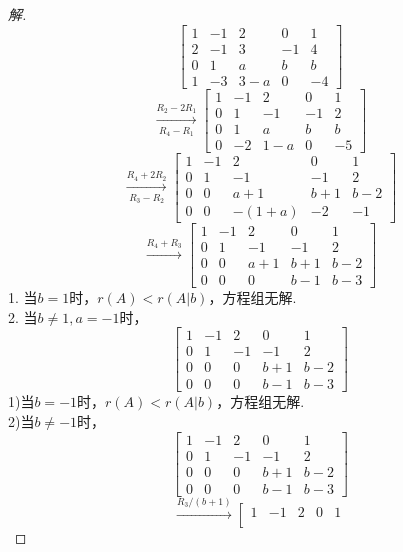 \documentclass[10pt,a4paper]{report}
\begin{document}
\begin{proof}[解]
	$$
	\left[
	\begin{matrix}
	1 & -1 & 2 & 0 & 1\\
	2 & -1 & 3 & -1 & 4\\
	0 & 1 & a & b & b\\
	1 & -3 & 3-a & 0 & -4
	\end{matrix}
	\right]
	$$
	$$
	\xrightarrow[R_{4}-R_{1}]{R_{2}-2R_{1}}
	\left[
	\begin{matrix}
	1 & -1 & 2 & 0 & 1\\
	0 & 1 & -1 & -1 & 2\\
	0 & 1 & a & b & b\\
	0 & -2 & 1-a & 0 & -5
	\end{matrix}
	\right]
	$$
	$$
	\xrightarrow[R_{3}-R_{2}]{R_{4}+2R_{2}}
	\left[
	\begin{matrix}
	1 & -1 & 2 & 0 & 1\\
	0 & 1 & -1 & -1 & 2\\
	0 & 0 & a+1 & b+1 & b-2\\
	0 & 0 & -(1+a) & -2 & -1
	\end{matrix}
	\right]
	$$
	$$
	\xrightarrow{R_{4}+R_{3}}
	\left[
	\begin{matrix}
	1 & -1 & 2 & 0 & 1\\
	0 & 1 & -1 & -1 & 2\\
	0 & 0 & a+1 & b+1 & b-2\\
	0 & 0 & 0 & b-1 & b-3
	\end{matrix}
	\right]
	$$
	1. 当$b=1$时，$r(A) < r(A|b)$，方程组无解.\\
	2. 当$b \neq 1, a = -1$时，
	$$
	\left[
	\begin{matrix}
	1 & -1 & 2 & 0 & 1\\
	0 & 1 & -1 & -1 & 2\\
	0 & 0 & 0 & b+1 & b-2\\
	0 & 0 & 0 & b-1 & b-3
	\end{matrix}
	\right]
	$$
	1)当$b=-1$时，$r(A) < r(A|b)$，方程组无解.\\
	2)当$b \neq -1$时，
	$$
	\left[
	\begin{matrix}
	1 & -1 & 2 & 0 & 1\\
	0 & 1 & -1 & -1 & 2\\
	0 & 0 & 0 & b+1 & b-2\\
	0 & 0 & 0 & b-1 & b-3
	\end{matrix}
	\right] 
	$$
	$$
	\xrightarrow{R_{3}/(b+1)}
	\left[
	\begin{matrix}
	1 & -1 & 2 & 0 & 1\\

\end{matrix}$$
\end{proof}
\end{document}
